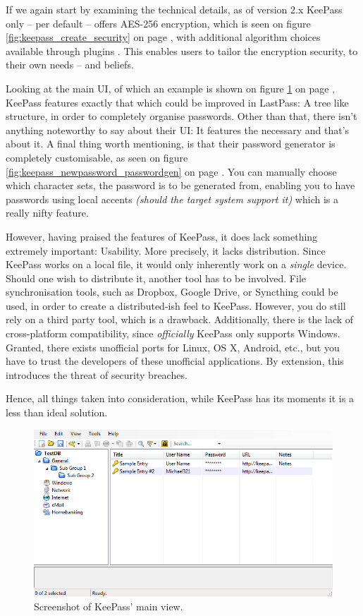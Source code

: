 			If we again start by examining the technical details, as of version 2.x KeePass only -- per default -- offers AES-256 encryption, which is seen on figure \ref{fig:keepass_create_security} on page \pageref{fig:keepass_create_security}, with additional algorithm choices available through plugins \cite{keepass_security}. This enables users to tailor the encryption security, to their own needs -- and beliefs. 

			Looking at the main UI, of which an example is shown on figure \ref{fig:keepass_main} on page \pageref{fig:keepass_main}, KeePass features exactly that which could be improved in LastPass: A tree like structure, in order to completely organise passwords. Other than that, there isn't anything noteworthy to say about their UI: It features the necessary and that's about it. A final thing worth mentioning, is that their password generator is completely customisable, as seen on figure \ref{fig:keepass_newpassword_passwordgen} on page \pageref{fig:keepass_newpassword_passwordgen}. You can manually choose which character sets, the password is to be generated from, enabling you to have passwords using local accents \emph{(should the target system support it)} which is a really nifty feature.


			However, having praised the features of KeePass, it does lack something extremely important: Usability. More precisely, it lacks distribution. Since KeePass works on a local file, it would only inherently work on a \emph{single} device. Should one wish to distribute it, another tool has to be involved. File synchronisation tools, such as Dropbox, Google Drive, or Syncthing could be used, in order to create a distributed-ish feel to KeePass. However, you do still rely on a third party tool, which is a drawback. Additionally, there is the lack of cross-platform compatibility, since \emph{officially} KeePass only supports Windows. Granted, there exists unofficial ports for Linux, OS X, Android, etc., but you have to trust the developers of these unofficial applications. By extension, this introduces the threat of security breaches. 

			Hence, all things taken into consideration, while KeePass has its moments it is a less than ideal solution.

			
			\begin{figure}[h!]
				\centering
				\includegraphics[width=\textwidth]{figures/analysis/keepass_mainview.png}
				\caption{Screenshot of KeePass' main view.}
				\label{fig:keepass_main}
			\end{figure}

